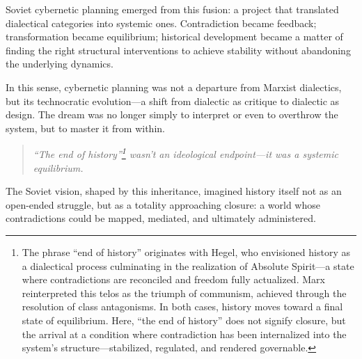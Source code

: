 \begin{tcolorbox}[colback=gray!10, colframe=black, title={Sidebar: From Marxist Dialectics to Soviet Cybernetic Planning}, fonttitle=\bfseries, breakable]
    Soviet cybernetic planning emerged from this fusion: a project that translated dialectical categories into systemic ones. Contradiction became feedback; transformation became equilibrium; historical development became a matter of finding the right structural interventions to achieve stability without abandoning the underlying dynamics.
    
    \medskip
    
    In this sense, cybernetic planning was not a departure from Marxist dialectics, but its technocratic evolution—a shift from dialectic as critique to dialectic as design. The dream was no longer simply to interpret or even to overthrow the system, but to master it from within.
    
    \begin{quote}
        \emph{“The end of history”\footnote{The phrase “end of history” originates with Hegel, who envisioned history as a dialectical process culminating in the realization of Absolute Spirit—a state where contradictions are reconciled and freedom fully actualized. Marx reinterpreted this telos as the triumph of communism, achieved through the resolution of class antagonisms. In both cases, history moves toward a final state of equilibrium. Here, “the end of history” does not signify closure, but the arrival at a condition where contradiction has been internalized into the system’s structure—stabilized, regulated, and rendered governable.} wasn’t an ideological endpoint—it was a systemic equilibrium.}
    \end{quote}
    
    The Soviet vision, shaped by this inheritance, imagined history itself not as an open-ended struggle, but as a totality approaching closure: a world whose contradictions could be mapped, mediated, and ultimately administered.
    
\end{tcolorbox}
    